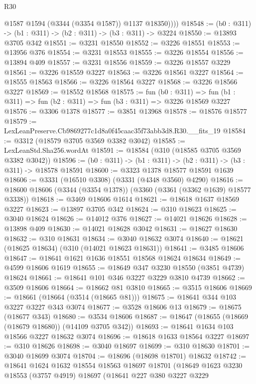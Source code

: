\begin{lexlean}{R30}
\begin{coremodule}
            @1587
            @1594
            (@3344 (@3354 @1587))
            @1137
            @18350))))
@18548 := (b0 : @311) -> (b1 : @311) -> (b2 : @311) -> (b3 : @311) -> @3224
@18550 := @13893 @3705 @342
@18551 := @3231 @18550
@18552 := @3226 @18551
@18553 := @13956 @376
@18554 := @3231 @18553
@18555 := @3226 @18554
@18556 := @13894 @409
@18557 := @3231 @18556
@18559 := @3226 @18557 @3229
@18561 := @3226 @18559 @3227
@18563 := @3226 @18561 @3227
@18564 := @18555 @18563
@18566 := @3226 @18564 @3227
@18568 := @3226 @18566 @3227
@18569 := @18552 @18568
@18575 := fun (b0 : @311) =>
  fun (b1 : @311) => fun (b2 : @311) => fun (b3 : @311) => @3226 @18569 @3227
@18576 := @3306 @1378
@18577 := @3851 @13968
@18578 := @18576 @18577
@18579 := LexLeanPreserve.Cb9869277c1d8a0f45caac35f73abb3d8.R30.__fits_19
@18584 := @3312 (@18579 @3705 @3569 @3382 @3042)
@18585 := LexLeanStd.Sha256.wordAt
@18591 := @18584 (@310 (@18585 @3705 @3569 @3382 @3042))
@18596 := (b0 : @311) -> (b1 : @311) -> (b2 : @311) -> (b3 : @311) -> @18578 @18591
@18600 := @3323 @1378 @18577 @18591 @1639
@18606 := @3331 (@16510 @3308) (@3331 (@4348 @3560) @4290)
@18616 := @18600 @18606 (@3344 (@3354 @1378)) (@3360 (@3361 (@3362 @1639) @18577 @3338))
@18618 := @3469 @18606 @1614
@18621 := @18618 @1637 @18569 @3227
@18623 := @13897 @3705 @342
@18624 := @310 @18623
@18625 := @3040 @18624
@18626 := @14012 @376
@18627 := @14021 @18626
@18628 := @13898 @409
@18630 := @14021 @18628 @3042
@18631 := @18627 @18630
@18632 := @310 @18631
@18634 := @3040 @18632 @3074
@18640 := @18621 (@18625 @18634) (@310 (@14021 @18623 @18631))
@18641 := @3485 @18606
@18647 := @18641 @1621 @1636 @18551 @18568 @18624 @18634
@18649 := @4599 @18606 @1619
@18655 := @18649 @347 @3230 @18550 (@3851 @4739) @18624
@18661 := @18641 @101 @346 @3227 @3229 @3810 @4739
@18662 := @3509 @18606
@18664 := @18662 @81 @3810
@18665 := @3515 @18606
@18669 := @18661 (@18664 (@3514 (@18665 @81)))
@18675 := @18641 @344 @103 @3227 @3227 @343 @3074
@18677 := @3528 @18606 @13
@18679 := @18675 (@18677 @343)
@18680 := @3534 @18606
@18687 := @18647 (@18655 (@18669 (@18679 @18680)) (@14109 @3705 @342))
@18693 := @18641 @1634 @103 @18566 @3227 @18632 @3074
@18696 := @18618 @1633 @18564 @3227
@18697 := @310 @18626
@18698 := @3040 @18697
@18699 := @310 @18630
@18701 := @3040 @18699 @3074
@18704 := @18696 (@18698 @18701) @18632
@18742 := @18641
    @1624
    @1632
    @18554
    @18563
    @18697
    @18701
    (@18649
      @1623
      @3230
      @18553
      (@3757 @4919)
      @18697
      (@18641
        @227
        @380
        @3227
        @3229

\end{coremodule}
\end{lexlean}
